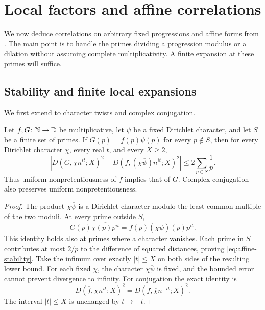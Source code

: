 \section{Local factors and affine correlations}
\label{sec:affine-corollaries}

We now deduce correlations on arbitrary fixed progressions and affine
forms from . The main point is to handle the primes
dividing a progression modulus or a dilation without assuming complete
multiplicativity. A finite expansion at these primes will suffice.

\subsection{Stability and finite local expansions}

We first extend  to character twists
and complex conjugation.

\begin{lemma}
\label{lem:affine-stability}
Let $f,G\colon\mathbb N\to\mathbb D$ be multiplicative, let $\psi$ be a
fixed Dirichlet character, and let $S$ be a finite set of primes.
If $G(p)=f(p)\psi(p)$ for every $p\notin S$, then for every Dirichlet
character $\chi$, every real $t$, and every $X\ge2$,
\begin{equation}
 \left|D(G,\chi n^{it};X)^2
       -D(f,(\chi\overline\psi)n^{it};X)^2\right|
 \le 2\sum_{p\in S}\frac1p.
 \label{eq:affine-stability}
\end{equation}
Thus uniform nonpretentiousness of $f$ implies that of $G$.
Complex conjugation also preserves uniform nonpretentiousness.
\end{lemma}

\begin{proof}
The product $\chi\overline\psi$ is a Dirichlet character modulo the
least common multiple of the two moduli. At every prime outside $S$,
\[
 G(p)\overline{\chi(p)p^{it}}
 =f(p)\overline{(\chi\overline\psi)(p)p^{it}}.
\]
This identity holds also at primes where a character vanishes. Each
prime in $S$ contributes at most $2/p$ to the difference of squared
distances, proving \eqref{eq:affine-stability}. Take the infimum over
exactly $|t|\le X$ on both sides of the resulting lower bound. For each
fixed $\chi$, the character $\chi\overline\psi$ is fixed, and the
bounded error cannot prevent divergence to infinity.
For conjugation the exact identity is
\[
 D(\overline f,\chi n^{it};X)^2
 =D(f,\overline\chi n^{-it};X)^2.
\]
The interval $|t|\le X$ is unchanged by $t\mapsto-t$.
\end{proof}

